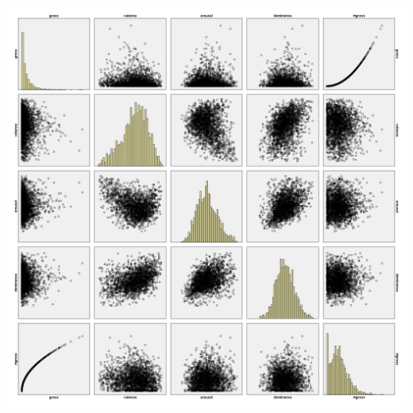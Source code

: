\documentclass[font=10pt]{article}
\begin{document}
\begin{center}
\includegraphics[width=18cm]{scatterplotmatrix}
\end{center}
\end{document}

